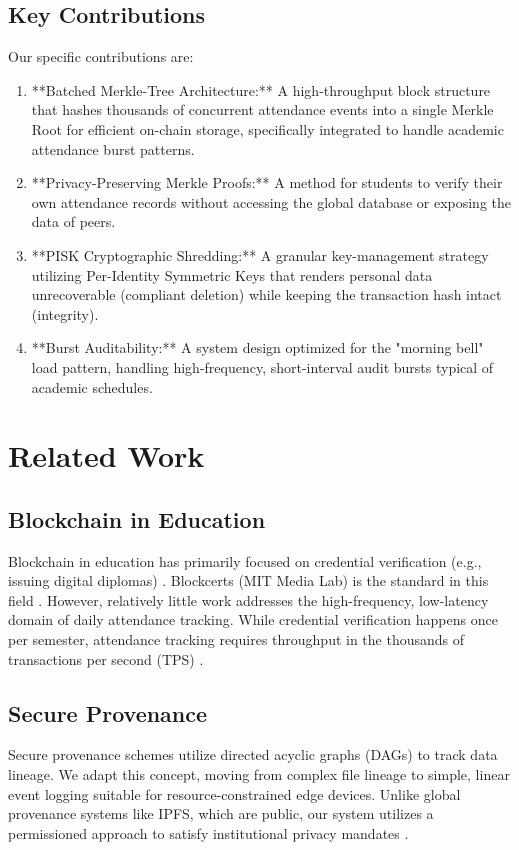 \documentclass[conference]{IEEEtran}
\begin{document}
\subsection{Key Contributions}
Our specific contributions are:
\begin{enumerate}
    \item **Batched Merkle-Tree Architecture:** A high-throughput block structure that hashes thousands of concurrent attendance events into a single Merkle Root for efficient on-chain storage, specifically integrated to handle academic attendance burst patterns.
    \item **Privacy-Preserving Merkle Proofs:** A method for students to verify their own attendance records without accessing the global database or exposing the data of peers.
    \item **PISK Cryptographic Shredding:** A granular key-management strategy utilizing Per-Identity Symmetric Keys that renders personal data unrecoverable (compliant deletion) while keeping the transaction hash intact (integrity).
    \item **Burst Auditability:** A system design optimized for the "morning bell" load pattern, handling high-frequency, short-interval audit bursts typical of academic schedules.
\end{enumerate}

\section{Related Work}

\subsection{Blockchain in Education}
Blockchain in education has primarily focused on credential verification (e.g., issuing digital diplomas) \cite{b1, b3}. Blockcerts (MIT Media Lab) is the standard in this field \cite{b4}. However, relatively little work addresses the high-frequency, low-latency domain of daily attendance tracking. While credential verification happens once per semester, attendance tracking requires throughput in the thousands of transactions per second (TPS) \cite{b2}.

\subsection{Secure Provenance}
Secure provenance schemes \cite{b5} utilize directed acyclic graphs (DAGs) to track data lineage. We adapt this concept, moving from complex file lineage to simple, linear event logging suitable for resource-constrained edge devices. Unlike global provenance systems like IPFS, which are public, our system utilizes a permissioned approach to satisfy institutional privacy mandates \cite{b7}.
\end{document}
